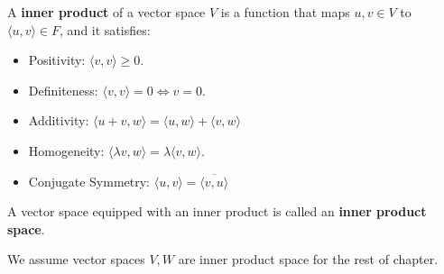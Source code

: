 \documentclass[../main.tex]{subfiles}
\begin{document}
\setcounter{section}{6}

\setcounter{definition}{1}
\begin{definition}
  A \textbf{inner product} of a vector space $V$
  is a function that maps $u, v \in V$ to $\langle u,v \rangle \in F$,
  and it satisfies:
  \begin{itemize}
    \item Positivity: $\langle v, v \rangle \ge 0$.
    \item Definiteness: $\langle v, v \rangle = 0 \iff v = 0$.
    \item Additivity: $\langle u + v, w \rangle = \langle u, w \rangle + \langle v, w \rangle$
    \item Homogeneity: $\langle \lambda v, w \rangle = \lambda \langle v, w \rangle$.
    \item Conjugate Symmetry: $\langle u, v \rangle = \overline{\langle v, u \rangle}$
  \end{itemize}
\end{definition}

\setcounter{definition}{3}
\begin{definition}
  A vector space equipped with an inner product is called an \textbf{inner product space}.
\end{definition}

We assume vector spaces $V, W$ are inner product space for the rest of chapter.
\end{document}
